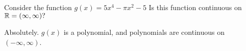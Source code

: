 \documentclass[handout]{ximera}
\begin{document}
\begin{exercise}

Consider the function $g(x) = 5x^4 - \pi x^2 - 5$  Is this function continuous on $\mathbb R = (\infty, \infty)?$  

\begin{multipleChoice}
\end{multipleChoice}

\begin{feedback}[correct]

Absolutely.  $g(x)$ is a polynomial, and polynomials are continuous on $(-\infty, \infty)$.

\end{feedback}

\end{exercise}
\end{document}
